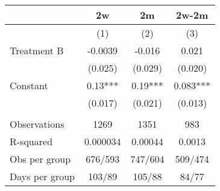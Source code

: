 \begin{tabular}{lccc}
\toprule
      & 2w    & 2m    & 2w-2m \\
\midrule
\midrule
      & (1)   & (2)   & (3) \\
\midrule
\midrule
Treatment B & -0.0039 & -0.016 & 0.021 \\
      & (0.025) & (0.029) & (0.020) \\
Constant & 0.13*** & 0.19*** & 0.083*** \\
      & (0.017) & (0.021) & (0.013) \\
      &       &       &  \\
\midrule
Observations & 1269  & 1351  & 983 \\
R-squared & 0.000034 & 0.00044 & 0.0013 \\
Obs per group & 676/593 & 747/604 & 509/474 \\
Days per group & 103/89 & 105/88 & 84/77 \\
\bottomrule
\bottomrule
\end{tabular}%
